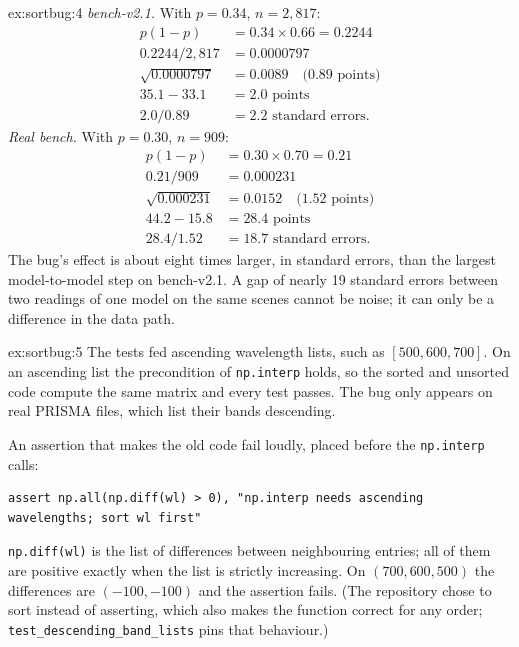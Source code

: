 \begin{solution}{ex:sortbug:4}
\emph{bench-v2.1.} With $p = 0.34$, $n = 2{,}817$:
\begin{align*}
p(1-p) &= 0.34 \times 0.66 = 0.2244\\
0.2244 / 2{,}817 &= 0.0000797\\
\sqrt{0.0000797} &= 0.0089 \quad\text{(0.89 points)}\\
35.1 - 33.1 &= 2.0 \text{ points}\\
2.0 / 0.89 &= 2.2 \text{ standard errors.}
\end{align*}
\emph{Real bench.} With $p = 0.30$, $n = 909$:
\begin{align*}
p(1-p) &= 0.30 \times 0.70 = 0.21\\
0.21 / 909 &= 0.000231\\
\sqrt{0.000231} &= 0.0152 \quad\text{(1.52 points)}\\
44.2 - 15.8 &= 28.4 \text{ points}\\
28.4 / 1.52 &= 18.7 \text{ standard errors.}
\end{align*}
The bug's effect is about eight times larger, in standard errors, than the largest model-to-model step on
bench-v2.1. A gap of nearly 19 standard errors between two readings of one model on the same scenes cannot be
noise; it can only be a difference in the data path.
\end{solution}

\begin{solution}{ex:sortbug:5}
The tests fed ascending wavelength lists, such as $[500, 600, 700]$. On an ascending list the precondition of
\texttt{np.interp} holds, so the sorted and unsorted code compute the same matrix and every test passes. The bug
only appears on real PRISMA files, which list their bands descending.

An assertion that makes the old code fail loudly, placed before the \texttt{np.interp} calls:
\begin{lstlisting}
assert np.all(np.diff(wl) > 0), "np.interp needs ascending wavelengths; sort wl first"
\end{lstlisting}
\texttt{np.diff(wl)} is the list of differences between neighbouring entries; all of them are positive exactly when
the list is strictly increasing. On $(700, 600, 500)$ the differences are $(-100, -100)$ and the assertion fails.
(The repository chose to sort instead of asserting, which also makes the function correct for any order;
\texttt{test\_descending\_band\_lists} pins that behaviour.)
\end{solution}
